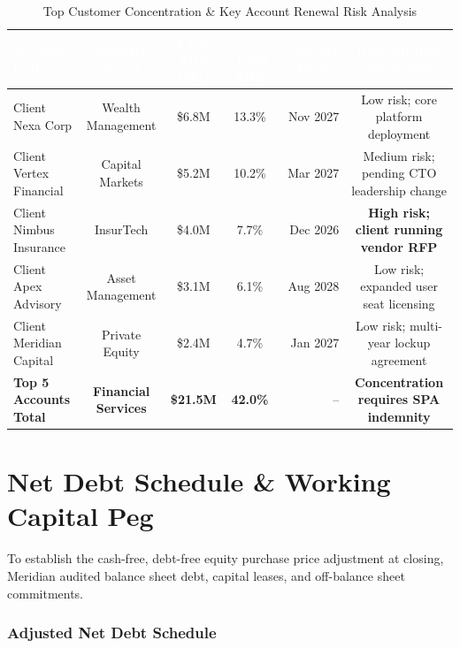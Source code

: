 \documentclass[10pt,a4paper,oneside]{scrreprt}
\newcommand{\tablehdr}[1]{\fontseries{b}\selectfont\textcolor{white}{#1}}
\begin{document}
\begin{table}[H]
\centering
\fontsize{8.5}{10.5}\selectfont
\renewcommand{\arraystretch}{1.02}
\begin{tabularx}{\textwidth}{L C C C r C}
\hline
{}
\tablehdr{Account Code} & \tablehdr{Industry Sector} & \tablehdr{FY25 ARR (\$M)} & \tablehdr{\% Total ARR} & \tablehdr{Contract Expiry} & \tablehdr{Renewal Risk Assessment} \\
\hline
Client Nexa Corp & Wealth Management & \$6.8M & 13.3\% & Nov 2027 & Low risk; core platform deployment \\
Client Vertex Financial & Capital Markets & \$5.2M & 10.2\% & Mar 2027 & Medium risk; pending CTO leadership change \\
Client Nimbus Insurance & InsurTech & \$4.0M & 7.7\% & Dec 2026 & \textcolor{SoftRed}{\textbf{High risk; client running vendor RFP}} \\
Client Apex Advisory & Asset Management & \$3.1M & 6.1\% & Aug 2028 & Low risk; expanded user seat licensing \\
Client Meridian Capital & Private Equity & \$2.4M & 4.7\% & Jan 2027 & Low risk; multi-year lockup agreement \\
\hline
{}
\textbf{Top 5 Accounts Total} & \textbf{Financial Services} & \textbf{\$21.5M} & \textbf{42.0\%} & -- & \textbf{Concentration requires SPA indemnity} \\
\hline
\end{tabularx}
\caption{Top Customer Concentration \& Key Account Renewal Risk Analysis}
\end{table}

\clearpage

\chapter{Net Debt Schedule \& Working Capital Peg}

To establish the cash-free, debt-free equity purchase price adjustment at closing, Meridian audited balance sheet debt, capital leases, and off-balance sheet commitments.

\subsection*{Adjusted Net Debt Schedule}
\end{document}
